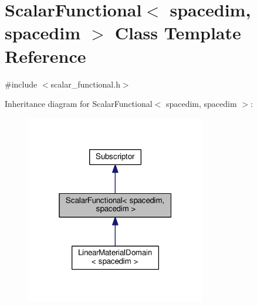 \hypertarget{class_scalar_functional_3_01spacedim_00_01spacedim_01_4}{}\section{Scalar\+Functional$<$ spacedim, spacedim $>$ Class Template Reference}
\label{class_scalar_functional_3_01spacedim_00_01spacedim_01_4}


{\ttfamily \#include $<$scalar\+\_\+functional.\+h$>$}



Inheritance diagram for Scalar\+Functional$<$ spacedim, spacedim $>$\+:\nopagebreak
\begin{figure}[H]
\begin{center}
\leavevmode
\includegraphics[width=223pt]{class_scalar_functional_3_01spacedim_00_01spacedim_01_4__inherit__graph}
\end{center}
\end{figure}


